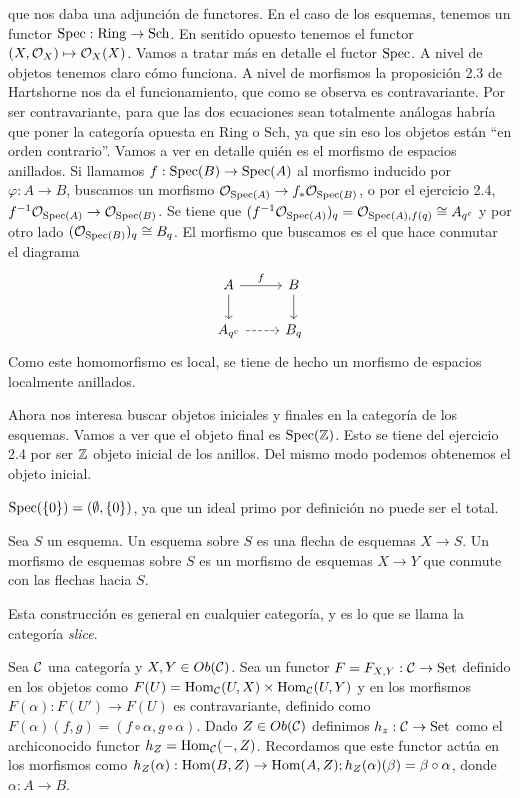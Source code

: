 \documentclass[GA.tex]{subfiles}
\begin{document}
que nos daba una adjunción de functores. En el caso de los esquemas, tenemos un functor $\operatorname{Spec}:\mathrm{Ring}\to \mathrm{Sch}$. En sentido opuesto tenemos el functor $(X,{\mathcal O}_X)\mapsto {\mathcal O}_X(X)$. Vamos a tratar más en detalle el fuctor $\operatorname{Spec}$. A nivel de objetos tenemos claro cómo funciona. A nivel de morfismos la proposición 2.3 de Hartshorne nos da el funcionamiento, que como se observa es contravariante. Por ser contravariante, para que las dos ecuaciones sean totalmente análogas habría que poner la categoría opuesta en $\mathrm{Ring}$ o $\mathrm{Sch}$, ya que sin eso los objetos están ``en orden contrario''. Vamos a ver en detalle quién es el morfismo de espacios anillados. Si llamamos $f:\operatorname{Spec}(B)\to\operatorname{Spec}(A)$ al morfismo inducido por $\varphi:A\to B$, buscamos un morfismo ${\mathcal O}_{\operatorname{Spec}(A)}\to f_*{\mathcal O}_{\operatorname{Spec}(B)}$, o por el ejercicio 2.4, $f^{-1}{\mathcal O}_{\operatorname{Spec}(A)}\to {\mathcal O}_{\operatorname{Spec}(B)}$. Se tiene que $(f^{-1}{\mathcal O}_{\operatorname{Spec}(A)})_q={\mathcal O}_{\operatorname{Spec}(A),f(q)}\cong A_{q^c}$ y por otro lado $({\mathcal O}_{\operatorname{Spec}(B)})_q\cong B_q$. El morfismo que buscamos es el que hace conmutar el diagrama
\[
\begin{tikzcd}
A\arrow[r, "f"]\arrow[d] & B\arrow[d]\\
A_{q^c}\arrow[r, dashed] & B_q
\end{tikzcd}
\]
Como este homomorfismo es local, se tiene de hecho un morfismo de espacios localmente anillados. 


Ahora nos interesa buscar objetos iniciales y finales en la categoría de los esquemas. Vamos a ver que el objeto final es $\operatorname{Spec}(\mathbb{Z})$. Esto se tiene del ejercicio 2.4 por ser $\mathbb{Z}$ objeto inicial de los anillos. Del mismo modo podemos obtenemos el objeto inicial. 
\
\begin{observacion}
$\operatorname{Spec}(\{0\})=(\emptyset,\{0\})$, ya que un ideal primo por definición no puede ser el total. 
\end{observacion}

\begin{defi}
Sea $S$ un esquema. Un esquema sobre $S$ es una flecha de esquemas $X\to S$. Un morfismo de esquemas sobre $S$ es un morfismo de esquemas $X\to Y$ que conmute con las flechas hacia $S$. 
\end{defi}

Esta construcción es general en cualquier categoría, y es lo que se llama la categoría \emph{slice}. 


Sea $\mathcal{C}$ una categoría y $X,Y\in Ob(\mathcal{C})$. Sea un functor $F=F_{X,Y}:\mathcal{C}\to\mathrm{Set}$ definido en los objetos como $F(U)=\operatorname{Hom}_{\mathcal{C}}(U,X)\times\operatorname{Hom}_{\mathcal{C}}(U,Y)$ y en los morfismos $F(\alpha):F(U')\to F(U)$ es contravariante, definido como $F(\alpha)(f,g)=(f\circ \alpha, g\circ\alpha)$. Dado $Z\in Ob(\mathcal{C})$ definimos $h_z:\mathcal{C}\to\mathrm{Set}$ como el archiconocido functor $h_Z=\operatorname{Hom}_{\mathcal{C}}(-,Z)$. Recordamos que este functor actúa en los morfismos como $h_Z(\alpha):\operatorname{Hom}(B,Z)\to \operatorname{Hom}(A,Z); h_Z(\alpha)(\beta)=\beta\circ\alpha$, donde $\alpha:A\to B$. 
\end{document}
